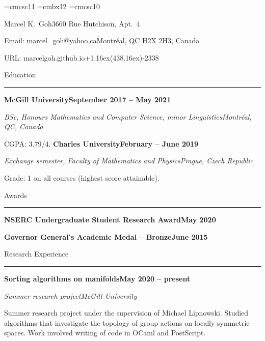 
\font\elevensc=cmcsc11  %
\font\bigbold=cmbx12  %
\font\tensc=cmcsc10 %

\newdimen\itemindent
\newif\ifitempar \itempartrue
\def\itemindentset#1{\setbox0\hbox{{\bf #1.\kern.25em}}\itemindent=\wd0\relax}
\def\pubbegin #1{\itemindentset{#11}} %
\def\ppubbegin #1{\itemindentset{#111}} %
\def\pubitem#1.{\ifitempar\smallskip\noindent\else\itempartrue
  \hskip-\parindent\fi
  \hbox to\itemindent{\bf\hfil #1.\kern.25em}%
  \hangindent=\itemindent\hangafter=1\ignorespaces}

\def\up#1{\leavevmode \raise.16ex\hbox{#1}}
\def\sectheader#1{{\bigskip\elevensc #1}\smallskip\hrule\medskip}
\def\leftright#1#2{{#1}\hfill{#2}\par}
\def\myname{{\tensc Marcel K. Goh}}

\parindent=0pt  %

\newcount\submittedcount
{}
\def\subitem{\pubitem S\the\submittedcount. \global\advance\submittedcount by 1}
\newcount\reportcount
{}
\def\repitem{\pubitem R\the\reportcount. \global\advance\reportcount by 1}


\leftright{\bigbold Marcel K.\ Goh}{3660 Rue Hutchison, Apt.\ 4}
\leftright{Email: marcel\_goh@yahoo.ca}{Montr\'eal, QC H2X 2H3, Canada}
\leftright{URL: marcelgoh.github.io}{+1\thinspace\up(438\up)\thinspace 886-2338}

\sectheader{Education}

\leftright{\bf McGill University}{\bf September 2017 -- May 2021}
\leftright{\sl BSc, Honours Mathematics and Computer Science, minor Linguistics}{\sl Montr\'eal, QC, Canada}
CGPA: 3.79/4.
\medskip
\leftright{\bf Charles University}{\bf February -- June 2019}
\leftright{\sl Exchange semester, Faculty of Mathematics and Physics}{\sl Prague, Czech Republic}
Grade: 1 on all courses (highest score attainable).

\sectheader{Awards}

\leftright{\bf NSERC Undergraduate Student Research Award}{\bf May 2020}
\smallskip
\leftright{\bf Governor General's Academic Medal -- Bronze}{\bf June 2015}

\sectheader{Research Experience}

\leftright{\bf Sorting algorithms on manifolds}{\bf May 2020 -- present}
\leftright{\sl Summer research project}{\sl McGill University}
\smallskip
Summer research project under the supervision of Michael Lipnowski.
Studied algorithms that investigate the topology of group actions on locally symmetric spaces.
Work involved writing of code in OCaml and PostScript.
\medskip

